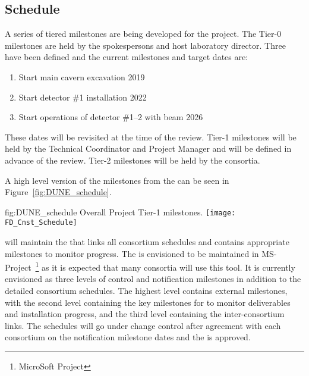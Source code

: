\subsection{Schedule}
\label{sec:fdsp-coord-controls}

A series of tiered milestones are being developed for the 
project. The Tier-0 milestones are held by the spokespersons and host
laboratory director. Three have been defined and the current milestones and
target dates are:
\begin{enumerate}
\item Start main cavern excavation \hspace{2.1in} 2019
\item Start detector \#1 installation \hspace{2.1in} 2022
\item Start operations of detector \#1--2 with beam \hspace{1in} 2026
\end{enumerate}
These dates will be revisited at the time of the  review.  Tier-1
milestones will be held by the Technical Coordinator and  Project
Manager and will be defined in advance of the  review. Tier-2
milestones will be held by the consortia.

A high level version of the  milestones from the 
can be seen in Figure~\ref{fig:DUNE_schedule}.

\begin{dunefigure}{fig:DUNE_schedule}
  {Overall  Project Tier-1 milestones.}
\texttt{[image: FD\_Cnst\_Schedule]}
\end{dunefigure}

 will maintain the  that links all consortium schedules
and contains appropriate milestones to monitor progress. The 
is envisioned to be maintained in MS-Project~\footnote{MicroSoft\texttrademark{} Project} as it is expected
that many consortia will use this tool. It is currently envisioned as
three levels of control and notification milestones in addition to the
detailed consortium schedules. The highest level contains external
milestones, with the second level containing the key milestones for 
to monitor deliverables and installation progress, and the third level
containing the inter-consortium links. The schedules will go
under change control after agreement with each consortium on the
notification milestone dates and the  is approved.

